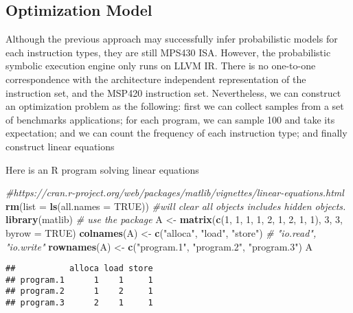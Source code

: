 \documentclass[]{article}
\newenvironment{Shaded}{\begin{snugshade}}{\end{snugshade}}
\newcommand{\CommentTok}[1]{\textcolor[rgb]{0.56,0.35,0.01}{\textit{#1}}}
\newcommand{\DataTypeTok}[1]{\textcolor[rgb]{0.13,0.29,0.53}{#1}}
\newcommand{\DecValTok}[1]{\textcolor[rgb]{0.00,0.00,0.81}{#1}}
\newcommand{\KeywordTok}[1]{\textcolor[rgb]{0.13,0.29,0.53}{\textbf{#1}}}
\newcommand{\NormalTok}[1]{#1}
\newcommand{\OtherTok}[1]{\textcolor[rgb]{0.56,0.35,0.01}{#1}}
\newcommand{\StringTok}[1]{\textcolor[rgb]{0.31,0.60,0.02}{#1}}
\begin{document}
\hypertarget{optimization-model}{%
\subsection{Optimization Model}\label{optimization-model}}

Although the previous approach may successfully infer probabilistic models for each instruction types, they are still MPS430 ISA. However, the probabilistic symbolic execution engine only runs on LLVM IR. There is no one-to-one correspondence with the architecture independent representation of the instruction set, and the MSP420 instruction set. Nevertheless, we can construct an optimization problem as the following: first we can collect samples from a set of benchmarks applications; for each program, we can sample 100 and take its expectation; and we can count the frequency of each instruction type; and finally construct linear equations

Here is an R program solving linear equations

\begin{Shaded}
\begin{Highlighting}[]
\CommentTok{#https://cran.r-project.org/web/packages/matlib/vignettes/linear-equations.html}
\KeywordTok{rm}\NormalTok{(}\DataTypeTok{list =} \KeywordTok{ls}\NormalTok{(}\DataTypeTok{all.names =} \OtherTok{TRUE}\NormalTok{)) }\CommentTok{#will clear all objects includes hidden objects.}
\KeywordTok{library}\NormalTok{(matlib)   }\CommentTok{# use the package}
\NormalTok{A <-}\StringTok{ }\KeywordTok{matrix}\NormalTok{(}\KeywordTok{c}\NormalTok{(}\DecValTok{1}\NormalTok{, }\DecValTok{1}\NormalTok{, }\DecValTok{1}\NormalTok{,}
              \DecValTok{1}\NormalTok{, }\DecValTok{2}\NormalTok{, }\DecValTok{1}\NormalTok{,}
              \DecValTok{2}\NormalTok{, }\DecValTok{1}\NormalTok{, }\DecValTok{1}\NormalTok{), }\DecValTok{3}\NormalTok{, }\DecValTok{3}\NormalTok{, }\DataTypeTok{byrow =} \OtherTok{TRUE}\NormalTok{)}
\KeywordTok{colnames}\NormalTok{(A) <-}\StringTok{ }\KeywordTok{c}\NormalTok{(}\StringTok{"alloca"}\NormalTok{, }\StringTok{"load"}\NormalTok{, }\StringTok{"store"}\NormalTok{) }\CommentTok{# "io.read", "io.write"}
\KeywordTok{rownames}\NormalTok{(A) <-}\StringTok{ }\KeywordTok{c}\NormalTok{(}\StringTok{"program.1"}\NormalTok{, }\StringTok{"program.2"}\NormalTok{, }\StringTok{"program.3"}\NormalTok{)}
\NormalTok{A}
\end{Highlighting}
\end{Shaded}

\begin{verbatim}
##           alloca load store
## program.1      1    1     1
## program.2      1    2     1
## program.3      2    1     1
\end{verbatim}
\end{document}

